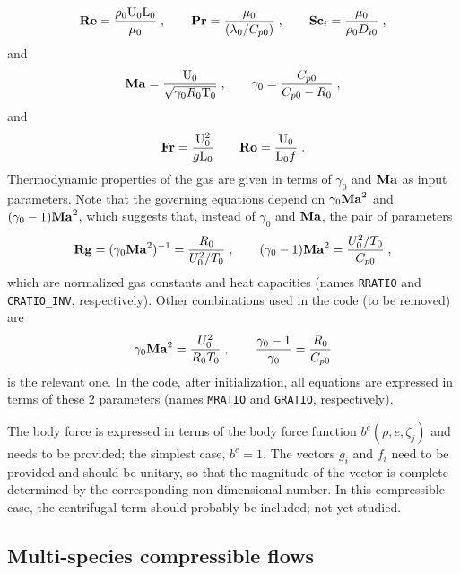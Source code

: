 \begin{equation}
  \mathrm{\bf Re} = \frac{\rho_0 \mathrm{U}_0 \mathrm{L}_0}{\mu_0}\;, \qquad
  \mathrm{\bf Pr} = \frac{\mu_0}{(\lambda_0/C_{p0})}\;, \qquad
  \mathrm{\bf Sc}_i = \frac{\mu_0}{\rho_0 D_{i0}}\;,
\end{equation}
and
\begin{equation}
  \mathrm{\bf Ma}  = \frac{\mathrm{U}_0}{\sqrt{\gamma_0 R_0 \mathrm{T}_0}}\;, \qquad
  \gamma_0 = \frac{C_{p0}}{C_{p0}-R_0}\;,
\end{equation}
and
\begin{equation}
  \mathrm{\bf Fr} = \frac{\mathrm{U}_0^2}{g\mathrm{L}_0} \qquad \mathrm{\bf Ro} = \frac{\mathrm{U}_0}{\mathrm{L}_0f} \;.
\end{equation}
Thermodynamic properties of the gas are given in terms of $\gamma_0$ and $\mathrm{\bf Ma}$ as input parameters. Note that the governing equations depend on $\gamma_0\mathrm{\bf Ma}^2$ and $(\gamma_0-1)\mathrm{\bf Ma}^2$, which suggests that, instead of $\gamma_0$ and $\mathrm{\bf Ma}$, the pair of parameters
\begin{equation}
    \mathrm{\bf Rg}=(\gamma_0\mathrm{\bf Ma}^2)^{-1}=\frac{R_0}{U^2_0/T_0}\;,\qquad (\gamma_0-1)\mathrm{\bf Ma}^2 =\frac{U_0^2/T_0}{C_{p0}} \;,
\end{equation}
which are normalized gas constants and heat capacities (names \texttt{RRATIO} and \texttt{CRATIO\_INV}, respectively). Other combinations used in the code (to be removed) are
\begin{equation}
    \gamma_0\mathrm{\bf Ma}^2=\frac{U_0^2}{R_0T_0}\;,\qquad \frac{\gamma_0-1}{\gamma_0}=\frac{R_0}{C_{p0}}
\end{equation}
is the relevant one. In the code, after initialization, all equations are expressed in terms of these 2 parameters (names \texttt{MRATIO} and \texttt{GRATIO}, respectively). 

The body force is expressed in terms of the body force function $b^e(\rho,e,\zeta_j)$ and needs to be provided; the simplest case, $b^e=1$. The vectors $g_i$ and $f_i$ need to be provided and should be unitary, so that the magnitude of the vector is complete determined by the corresponding non-dimensional number. In this compressible case, the centrifugal term should probably be included; not yet studied.

\subsection{Multi-species compressible flows}

